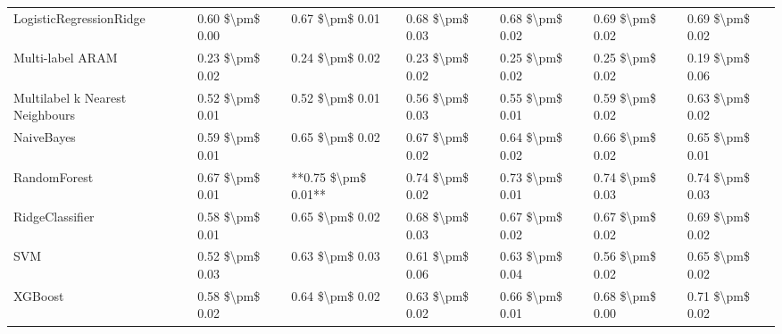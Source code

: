 \begin{tabular}{lllllll}
        LogisticRegressionRidge & 0.60 \$\textbackslash pm\$ 0.00 &           0.67 \$\textbackslash pm\$ 0.01 &       0.68 \$\textbackslash pm\$ 0.03 &        0.68 \$\textbackslash pm\$ 0.02 &                         0.69 \$\textbackslash pm\$ 0.02 & 0.69 \$\textbackslash pm\$ 0.02 \\
               Multi-label ARAM & 0.23 \$\textbackslash pm\$ 0.02 &           0.24 \$\textbackslash pm\$ 0.02 &       0.23 \$\textbackslash pm\$ 0.02 &        0.25 \$\textbackslash pm\$ 0.02 &                         0.25 \$\textbackslash pm\$ 0.02 & 0.19 \$\textbackslash pm\$ 0.06 \\
Multilabel k Nearest Neighbours & 0.52 \$\textbackslash pm\$ 0.01 &           0.52 \$\textbackslash pm\$ 0.01 &       0.56 \$\textbackslash pm\$ 0.03 &        0.55 \$\textbackslash pm\$ 0.01 &                         0.59 \$\textbackslash pm\$ 0.02 & 0.63 \$\textbackslash pm\$ 0.02 \\
                     NaiveBayes & 0.59 \$\textbackslash pm\$ 0.01 &           0.65 \$\textbackslash pm\$ 0.02 &       0.67 \$\textbackslash pm\$ 0.02 &        0.64 \$\textbackslash pm\$ 0.02 &                         0.66 \$\textbackslash pm\$ 0.02 & 0.65 \$\textbackslash pm\$ 0.01 \\
                   RandomForest & 0.67 \$\textbackslash pm\$ 0.01 &       **0.75 \$\textbackslash pm\$ 0.01** &       0.74 \$\textbackslash pm\$ 0.02 &        0.73 \$\textbackslash pm\$ 0.01 &                         0.74 \$\textbackslash pm\$ 0.03 & 0.74 \$\textbackslash pm\$ 0.03 \\
                RidgeClassifier & 0.58 \$\textbackslash pm\$ 0.01 &           0.65 \$\textbackslash pm\$ 0.02 &       0.68 \$\textbackslash pm\$ 0.03 &        0.67 \$\textbackslash pm\$ 0.02 &                         0.67 \$\textbackslash pm\$ 0.02 & 0.69 \$\textbackslash pm\$ 0.02 \\
                            SVM & 0.52 \$\textbackslash pm\$ 0.03 &           0.63 \$\textbackslash pm\$ 0.03 &       0.61 \$\textbackslash pm\$ 0.06 &        0.63 \$\textbackslash pm\$ 0.04 &                         0.56 \$\textbackslash pm\$ 0.02 & 0.65 \$\textbackslash pm\$ 0.02 \\
                        XGBoost & 0.58 \$\textbackslash pm\$ 0.02 &           0.64 \$\textbackslash pm\$ 0.02 &       0.63 \$\textbackslash pm\$ 0.02 &        0.66 \$\textbackslash pm\$ 0.01 &                         0.68 \$\textbackslash pm\$ 0.00 & 0.71 \$\textbackslash pm\$ 0.02 \\
\bottomrule
\end{tabular}
